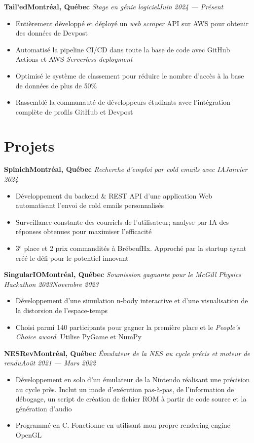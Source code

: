 \documentclass{article}
\newcommand{\newrole}[4]{
    {\normalfont\bfseries #1\hfill#3}
    \newline
    \textit{#2}\hfill\textit{#4}
}
\newenvironment{bulletpoints}{\vspace*{-0.2em}\begin{itemize}\setlength\itemsep{-0.3em}}{\end{itemize}}
\begin{document}
\newrole{Tail'ed}{Stage en génie logiciel}{Montréal, Québec}{Juin 2024 --- Présent}
\begin{bulletpoints}
    \item Entièrement développé et déployé un \emph{web scraper} API sur AWS pour obtenir des données de Devpost
    \item Automatisé la pipeline CI/CD dans toute la base de code avec GitHub Actions et AWS \emph{Serverless deployment}
    \item Optimisé le système de classement pour réduire le nombre d'accès à la base de données de plus de 50\%
    \item Rassemblé la communauté de développeurs étudiants avec l'intégration complète de profils GitHub et Devpost
\end{bulletpoints}


\section*{Projets}

\newrole{Spinich}{Recherche d'emploi par cold emails avec IA}{Montréal, Québec}{Janvier 2024}
\begin{bulletpoints}
    \item Développement du backend \& REST API d'une application Web automatisant l'envoi de cold emails personnalisés
    \item Surveillance constante des courriels de l'utilisateur; analyse par IA des réponses obtenues pour maximiser l'efficacité
    \item 3$^e$\hspace*{-0.1em} place et 2 prix commandités à BrébeufHx. Approché par la startup ayant créé le défi pour le potentiel innovant
\end{bulletpoints}

\newrole{SingularIO}{Soumission gagnante pour le McGill Physics Hackathon 2023}{Montréal, Québec}{Novembre 2023}
\begin{bulletpoints}
    \item Développement d'une simulation n-body interactive et d'une visualisation de la distorsion de l'espace-temps
    \item Choisi parmi 140 participants pour gagner la première place et le \emph{People's Choice award}. Utilise PyGame et NumPy
\end{bulletpoints}

\newrole{NESRev}{Émulateur de la NES au cycle précis et moteur de rendu}{Montréal, Québec}{Août 2021 --- Mars 2022}
\begin{bulletpoints}
    \item Développement en solo d'un émulateur de la Nintendo réalisant une précision au cycle près. Inclut un mode d’exécution pas-à-pas, de l'information de débogage, un script de création de fichier ROM à partir de code source et la génération d'audio
    \item Programmé en C. Fonctionne en utilisant mon propre rendering engine OpenGL
\end{bulletpoints}
\end{document}
